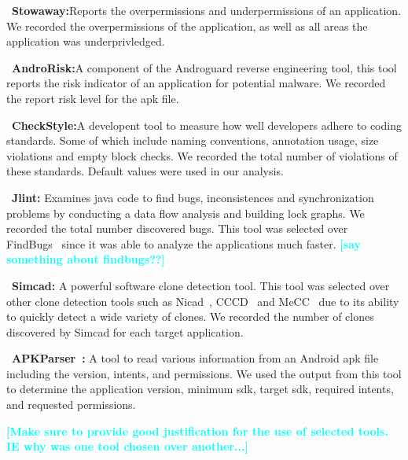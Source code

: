 \documentclass{sig-alternate}
\newcommand{\todo}[1]{\textcolor{cyan}{\textbf{[#1]}}}
\begin{document}
 \begin{description}
    \item~\textbf{Stowaway\cite{Felt:2011:APD:2046707.2046779}:}Reports the overpermissions and underpermissions of an application. We recorded the overpermissions of the application, as well as all areas the application was underprivledged.
    \item~\textbf{AndroRisk\cite{androguard_url}:}A component of the Androguard reverse engineering tool, this tool reports the risk indicator of an application for potential malware. We recorded the report risk level for the apk file.
    \item~\textbf{CheckStyle\cite{checkstyle_key}:}A developent tool to measure how well developers adhere to coding standards. Some of which include naming conventions, annotation usage, size violations and empty block checks. We recorded the total number of violations of these standards. Default values were used in our analysis.
    \item~\textbf{Jlint\cite{jlint_key}:} Examines java code to find bugs, inconsistences and synchronization problems by conducting a data flow analysis and building lock graphs. We recorded the total number discovered bugs. This tool was selected over FindBugs~\cite{findbugs_key} since it was able to analyze the applications much faster. \todo{say something about findbugs??}
    \item~\textbf{Simcad\cite{6613857}:} A powerful software clone detection tool. This tool was selected over other clone detection tools such as Nicad~\cite{Cordy:2011:NCD:2057176.2057234}, CCCD~\cite{6671332} and MeCC~\cite{Kim:2011:MMC:1985793.1985835} due to its ability to quickly detect a wide variety of clones. We recorded the number of clones discovered by Simcad for each target application.
    \item~\textbf{APKParser~\cite{apkparser_link}:} A tool to read various information from an Android apk file including the version, intents, and permissions. We used the output from this tool to determine the application version, minimum sdk, target sdk, required intents, and requested permissions.



\end{description}


\todo{Make sure to provide good justification for the use of selected tools. IE why was one tool chosen over another...}

\end{document}
